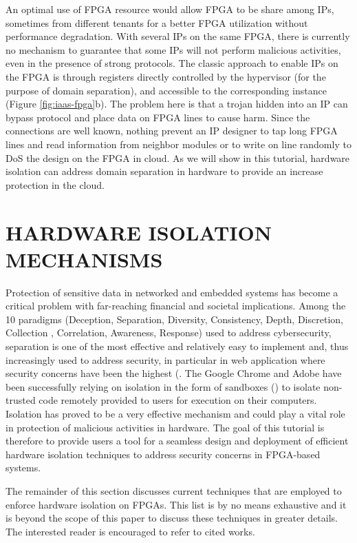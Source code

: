 \documentclass[sigconf]{acmart}
\theoremstyle{plain}
\theoremstyle{remark}
\begin{document}
An optimal use of FPGA resource would allow FPGA to be share among IPs, sometimes from different tenants for a better FPGA utilization without performance degradation. With several IPs on the same FPGA, there is currently no mechanism to guarantee that some IPs will not perform malicious activities, even in the presence of strong protocols. The classic approach to enable IPs on the FPGA is through registers directly controlled by the hypervisor (for the purpose of domain separation), and accessible to the corresponding instance (Figure \ref{fig:iaas-fpga}b). The problem here is that a trojan hidden into an IP can bypass protocol and place data on FPGA lines to cause harm. Since the connections are well known, nothing prevent an IP designer to tap long FPGA lines and read information from neighbor modules or to write on line randomly to DoS the design on the FPGA in cloud. As we will show in this tutorial, hardware isolation can address domain separation in hardware to provide an increase protection in the cloud.

\section{HARDWARE ISOLATION MECHANISMS} \label{sec:problem_definition}

Protection of sensitive data in networked and embedded systems has become a critical problem with far-reaching financial and societal implications. Among the 10 paradigms (Deception, Separation, Diversity,  Consistency, Depth, Discretion, Collection , Correlation, Awareness, Response)  used to address cybersecurity, separation is one of the most effective and relatively easy to implement and, thus increasingly used to address security, in particular in web application where security concerns have been the highest (\cite{Mello2015,  JonesCU, Fireglass2016, Cottrell2017}. The Google Chrome and Adobe have been successfully relying on isolation in the form of sandboxes (\cite{chromiumSB, adobeSB}) to isolate non-trusted code remotely provided to users for execution on their computers. Isolation has proved to be a very effective mechanism and could play a vital role in protection of malicious activities in hardware. The goal of this tutorial is therefore to provide users a tool for a seamless design and deployment of efficient hardware isolation techniques to address security concerns in FPGA-based systems.

The remainder of this section discusses current techniques that are employed to enforce hardware isolation on FPGAs. This list is by no means exhaustive and it is beyond the scope of this paper to discuss these techniques in greater details. The interested reader is encouraged to refer to cited works.
\end{document}

